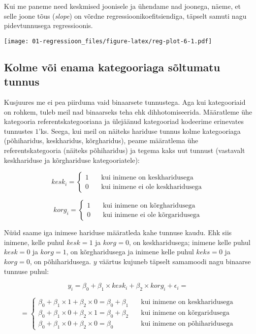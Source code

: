 \documentclass[
]{book}
\begin{document}
Kui me paneme need keskmised joonisele ja ühendame nad joonega, näeme, et selle joone tõus (\emph{slope}) on võrdne regressioonikoefitsiendiga, täpselt samuti nagu pidevtunnusega regressioonis.

\texttt{[image: 01-regressioon\_files/figure-latex/reg-plot-6-1.pdf]}

\hypertarget{kolme-vuxf5i-enama-kategooriaga-suxf5ltumatu-tunnus}{%
\subsection{Kolme või enama kategooriaga sõltumatu tunnus}\label{kolme-vuxf5i-enama-kategooriaga-suxf5ltumatu-tunnus}}

Kusjuures me ei pea piirduma vaid binaarsete tunnustega. Aga kui kategooriaid on rohkem, tuleb meil nad binaarseks teha ehk dihhotomiseerida. Määratleme ühe kategooria referentskategooriana ja ülejäänud kategooriad kodeerime erinevates tunnustes \(1\)'ks. Seega, kui meil on näiteks hariduse tunnus kolme kategooriaga (põhiharidus, keskharidus, kõrgharidus), peame määratlema ühe referentskategooria (näiteks põhiharidus) ja tegema kaks uut tunnust (vastavalt keskhariduse ja kõrghariduse kategooriatele):

\[ kesk_{i} =
  \begin{cases}
    1  & \quad \text{kui inimene on keskharidusega}\\
    0  & \quad \text{kui inimene ei ole keskharidusega}
  \end{cases}
\]

\[ korg_{i} =
  \begin{cases}
    1  & \quad \text{kui inimene on kõrgharidusega}\\
    0  & \quad \text{kui inimene ei ole kõrgaridusega}
  \end{cases}
\]

Nüüd saame iga inimese hariduse määratleda kahe tunnuse kaudu. Ehk siis inimene, kelle puhul \(kesk = 1\) ja \(korg = 0\), on keskharidusega; inimene kelle puhul \(kesk = 0\) ja \(korg = 1\), on kõrgharidusega ja inimene kelle puhul \(keks = 0\) ja \(korg = 0\), on põhiharidusega. \(y\) väärtus kujuneb täpselt samamoodi nagu binaarse tunnuse puhul:

\[y_i=\beta_0+\beta_1 \times kesk_i+\beta_2 \times korg_i+\epsilon_i =\]

\[ =
  \begin{cases}
    \beta_0+\beta_1 \times 1+\beta_2 \times 0 = \beta_0+\beta_1  & \quad \text{kui inimene on keskharidusega}\\
    \beta_0+\beta_1 \times 0+\beta_2 \times 1 = \beta_0+\beta_2  & \quad \text{kui inimene on kõrgaridusega}\\
    \beta_0+\beta_1 \times 0+\beta_2 \times 0 = \beta_0  & \quad \text{kui inimene on põhiharidusega}
  \end{cases}
\]
\end{document}
